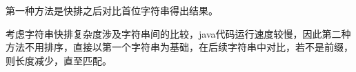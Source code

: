 第一种方法是快排之后对比首位字符串得出结果。\par

考虑字符串快排复杂度涉及字符串间的比较，java代码运行速度较慢，因此第二种方法不用排序，直接以第一个字符串为基础，在后续字符串中对比，若不是前缀，则长度减少，直至匹配。\par
